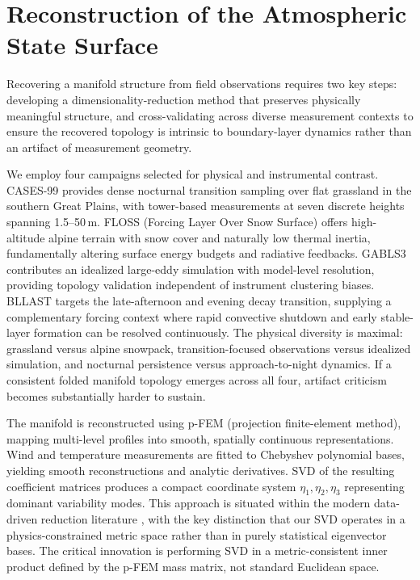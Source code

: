 \documentclass[12pt,a4paper]{article}
\begin{document}
\section{Reconstruction of the Atmospheric State Surface}

Recovering a manifold structure from field observations requires two key steps: developing a dimensionality-reduction method that preserves physically meaningful structure, and cross-validating across diverse measurement contexts to ensure the recovered topology is intrinsic to boundary-layer dynamics rather than an artifact of measurement geometry.

We employ four campaigns selected for physical and instrumental contrast. CASES-99 \citep{poulos2002} provides dense nocturnal transition sampling over flat grassland in the southern Great Plains, with tower-based measurements at seven discrete heights spanning 1.5--50\,m. FLOSS (Forcing Layer Over Snow Surface) offers high-altitude alpine terrain with snow cover and naturally low thermal inertia, fundamentally altering surface energy budgets and radiative feedbacks. GABLS3 \citep{beare2004} contributes an idealized large-eddy simulation with model-level resolution, providing topology validation independent of instrument clustering biases. BLLAST targets the late-afternoon and evening decay transition, supplying a complementary forcing context where rapid convective shutdown and early stable-layer formation can be resolved continuously. The physical diversity is maximal: grassland versus alpine snowpack, transition-focused observations versus idealized simulation, and nocturnal persistence versus approach-to-night dynamics. If a consistent folded manifold topology emerges across all four, artifact criticism becomes substantially harder to sustain.

The manifold is reconstructed using p-FEM (projection finite-element method), mapping multi-level profiles into smooth, spatially continuous representations. Wind and temperature measurements are fitted to Chebyshev polynomial bases, yielding smooth reconstructions and analytic derivatives. SVD of the resulting coefficient matrices produces a compact coordinate system $\eta_1, \eta_2, \eta_3$ representing dominant variability modes. This approach is situated within the modern data-driven reduction literature \citep{brunton2016, peherstorfer2016, shimizu2017}, with the key distinction that our SVD operates in a physics-constrained metric space rather than in purely statistical eigenvector bases. The critical innovation is performing SVD in a metric-consistent inner product defined by the p-FEM mass matrix, not standard Euclidean space.
\end{document}
